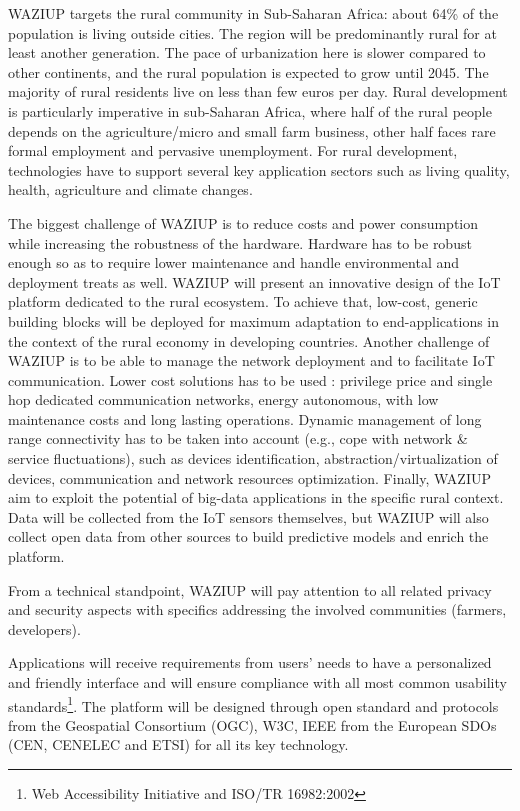 WAZIUP targets the rural community in Sub-Saharan Africa: about 64\% of the population is living outside cities.
The region will be predominantly rural for at least another generation.
The pace of urbanization here is slower compared to other continents, and the rural population is expected to grow until 2045.
The majority of rural residents live on less than few euros per day.
Rural development is particularly imperative in sub-Saharan Africa, where half of the rural people depends on the agriculture/micro and small farm business, other half faces rare formal employment and pervasive unemployment.
For rural development, technologies have to support several key application sectors such as living quality, health, agriculture and climate changes.

The biggest challenge of WAZIUP is to reduce costs and power consumption while increasing the robustness of the hardware.
Hardware has to be robust enough so as to require lower maintenance and handle environmental and deployment treats as well.
WAZIUP will present an innovative design of the IoT platform dedicated to the rural ecosystem.
To achieve that, low-cost, generic building blocks will be deployed for maximum adaptation to end-applications in the context of the rural economy in developing countries.
Another challenge of WAZIUP is to be able to manage the network deployment and to facilitate IoT communication.
Lower cost solutions has to be used : privilege price and single hop dedicated communication networks, energy autonomous, with low maintenance costs and long lasting operations.
Dynamic management of long range connectivity has to be taken into account (e.g., cope with network \& service fluctuations), such as devices identification, abstraction/virtualization of devices, communication and network resources optimization.
Finally, WAZIUP aim to exploit the potential of big-data applications in the specific rural context.
Data will be collected from the IoT sensors themselves, but WAZIUP will also collect open data from other sources to build predictive models and enrich the platform.

From a technical standpoint, WAZIUP will pay attention to all related privacy and security aspects with specifics addressing the involved communities (farmers, developers).

Applications will receive requirements from users’ needs to have a personalized and friendly interface and will ensure compliance with all most common usability standards\footnote{Web Accessibility Initiative and ISO/TR 16982:2002}.
The platform will be designed through open standard and protocols from the Geospatial Consortium (OGC), W3C, IEEE from the European SDOs (CEN, CENELEC and ETSI) for all its key technology.

